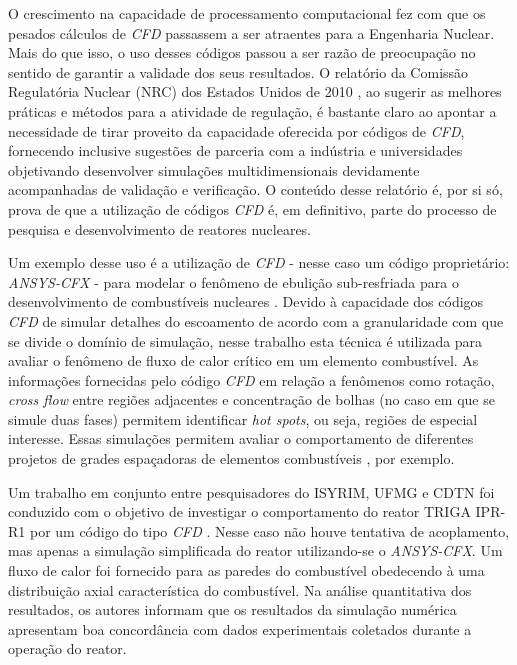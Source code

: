 





O crescimento na capacidade de processamento
computacional 
fez com que os pesados cálculos de \textit{CFD} passassem a ser atraentes 
para a Engenharia Nuclear. Mais do que isso, o uso desses códigos passou a ser razão 
de preocupação no sentido de garantir a validade dos seus resultados. O relatório 
da Comissão Regulatória Nuclear (NRC) dos Estados Unidos de 2010 \cite[p.69]{NUREG2010}, 
ao sugerir as melhores práticas e métodos para a atividade de regulação, é bastante claro 
ao apontar a necessidade de tirar proveito da capacidade oferecida por códigos de \textit{CFD}, 
fornecendo inclusive sugestões de parceria com a indústria e universidades objetivando 
desenvolver simulações multidimensionais devidamente acompanhadas de validação e
verificação. O conteúdo desse relatório é, por si só, prova de que a utilização de 
códigos \textit{CFD} é, em definitivo, parte do processo de 
pesquisa e desenvolvimento de reatores nucleares. 

Um exemplo desse uso é a utilização de \textit{CFD} - nesse caso um código proprietário: 
\textit{ANSYS-CFX} - para modelar o fenômeno de ebulição sub-resfriada para o 
desenvolvimento de combustíveis nucleares \cite{Krepper2007}. Devido à capacidade 
dos códigos \textit{CFD} de simular detalhes do escoamento de acordo com a granularidade com que se
divide o domínio de simulação, nesse trabalho esta técnica é utilizada para avaliar 
o fenômeno de fluxo de calor crítico em um elemento combustível. As informações 
fornecidas pelo código \textit{CFD} em relação a fenômenos como rotação, \textit{cross flow} entre 
regiões adjacentes e concentração de bolhas (no caso em que se simule duas fases)
permitem identificar \textit{hot spots}, ou seja, regiões de especial interesse.
Essas simulações permitem avaliar o comportamento
de diferentes projetos de grades espaçadoras de elementos combustíveis \cite{Navarro2011}, por exemplo.

Um trabalho em conjunto entre pesquisadores do ISYRIM, UFMG e CDTN foi conduzido
com o objetivo de investigar o comportamento do reator TRIGA IPR-R1 por um código do tipo \textit{CFD} \cite{Martinez2012}. 
Nesse caso não houve tentativa de acoplamento, mas apenas a simulação simplificada 
do reator utilizando-se o \textit{ANSYS-CFX}. Um fluxo de calor 
foi fornecido para as paredes do combustível obedecendo à uma distribuição axial 
característica do combustível. Na análise quantitativa dos resultados, os autores 
informam que os resultados da simulação numérica apresentam boa concordância com 
dados experimentais coletados durante a operação do reator.

